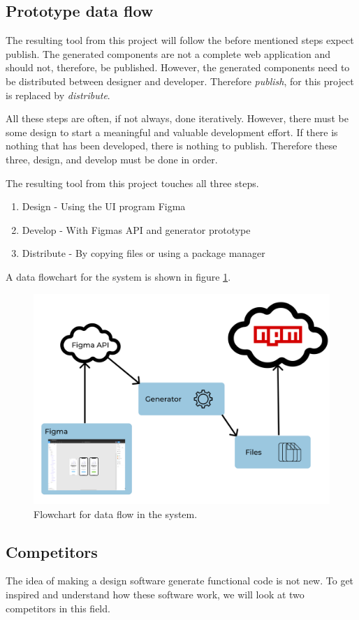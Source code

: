 \subsection{Prototype data flow}%
\label{sub:Prototype data flow}
The resulting tool from this project will follow the before mentioned steps expect publish. The generated \glspl{component} are not a complete web application and should not, therefore, be published. However, the generated \glspl{component} need to be distributed between designer and developer. Therefore \textit{publish}, for this project is replaced by \textit{distribute}. 

All these steps are often, if not always, done iteratively. However, there must be some design to start a meaningful and valuable development effort. If there is nothing that has been developed, there is nothing to publish. Therefore these three, design, and develop must be done in order. 

The resulting tool from this project touches all three steps. 
\begin{enumerate}
  \item Design - Using the UI program Figma
  \item Develop - With Figmas API and generator prototype
  \item Distribute - By copying files or using a package manager 
\end{enumerate}
A data flowchart for the system is shown in figure \ref{fig:flow}.

\begin{figure}[H]
  \centering
  \includegraphics[width=0.8\linewidth]{images/flow2.png}
  \caption{Flowchart for data flow in the system.}%
  \label{fig:flow}
\end{figure}


\subsection{Competitors}%
\label{sub:Competitors}
The idea of making a design software generate functional code is not new. To get inspired and understand how these software work, we will look at two competitors in this field. 

